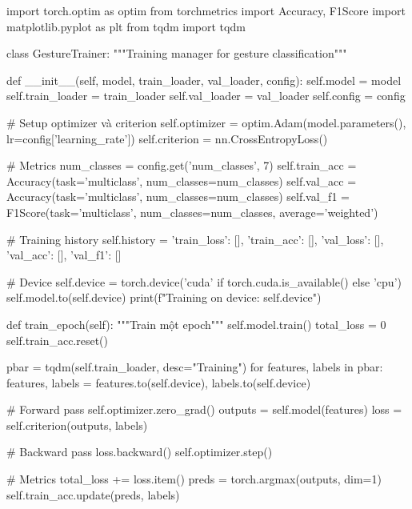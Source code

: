 \begin{aivncodebox}
\begin{python}
import torch.optim as optim
from torchmetrics import Accuracy, F1Score
import matplotlib.pyplot as plt
from tqdm import tqdm

class GestureTrainer:
    """Training manager for gesture classification"""
    
    def __init__(self, model, train_loader, val_loader, config):
        self.model = model
        self.train_loader = train_loader
        self.val_loader = val_loader
        self.config = config
        
        # Setup optimizer và criterion
        self.optimizer = optim.Adam(model.parameters(), 
                                   lr=config['learning_rate'])
        self.criterion = nn.CrossEntropyLoss()
        
        # Metrics
        num_classes = config.get('num_classes', 7)
        self.train_acc = Accuracy(task='multiclass', num_classes=num_classes)
        self.val_acc = Accuracy(task='multiclass', num_classes=num_classes)
        self.val_f1 = F1Score(task='multiclass', num_classes=num_classes, 
                             average='weighted')
        
        # Training history
        self.history = {
            'train_loss': [], 'train_acc': [],
            'val_loss': [], 'val_acc': [], 'val_f1': []
        }
        
        # Device
        self.device = torch.device('cuda' if torch.cuda.is_available() else 'cpu')
        self.model.to(self.device)
        print(f"Training on device: {self.device}")
    
    def train_epoch(self):
        """Train một epoch"""
        self.model.train()
        total_loss = 0
        self.train_acc.reset()
        
        pbar = tqdm(self.train_loader, desc="Training")
        for features, labels in pbar:
            features, labels = features.to(self.device), labels.to(self.device)
            
            # Forward pass
            self.optimizer.zero_grad()
            outputs = self.model(features)
            loss = self.criterion(outputs, labels)
            
            # Backward pass
            loss.backward()
            self.optimizer.step()
            
            # Metrics
            total_loss += loss.item()
            preds = torch.argmax(outputs, dim=1)
            self.train_acc.update(preds, labels)
            

\end{python}
\end{aivncodebox}

